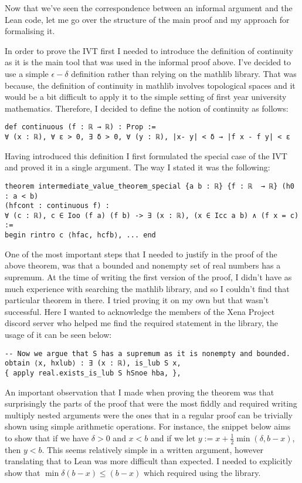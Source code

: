 \documentclass[11pt]{article}
\begin{document}
Now that we've seen the correspondence between an informal argument and the
Lean code, let me go over the structure of the main proof and my approach for
formalising it.

In order to prove the IVT first I needed to introduce the definition of
continuity as it is the main tool that was used in the informal proof above.
I've decided to use a simple $\epsilon-\delta$ definition rather than relying
on the mathlib library. That was because, the definition of continuity in
mathlib involves topological spaces and it would be a bit difficult to apply
it to the simple setting of first year university mathematics. Therefore, I
decided to define the notion of continuity as follows:


\begin{verbatim}
def continuous (f : ℝ → ℝ) : Prop :=
∀ (x : ℝ), ∀ ε > 0, ∃ δ > 0, ∀ (y : ℝ), |x- y| < δ → |f x - f y| < ε
\end{verbatim}
Having introduced this definition I first formulated the special case of the
IVT and proved it in a single argument. The way I stated it was the following:

\begin{verbatim}
theorem intermediate_value_theorem_special {a b : ℝ} {f : ℝ  → ℝ} (h0 : a < b)
(hfcont : continuous f) :
∀ (c : ℝ), c ∈ Ioo (f a) (f b) -> ∃ (x : ℝ), (x ∈ Icc a b) ∧ (f x = c) :=
begin rintro c ⟨hfac, hcfb⟩, ... end
\end{verbatim}
One of the most important steps that I needed to justify in the proof of the
above theorem, was that a bounded and nonempty set of real numbers has a
supremum. At the time of writing the first version of the proof, I didn't have
as much experience with searching the mathlib library, and so I couldn't find
that particular theorem in there. I tried proving it on my own but that wasn't
successful. Here I wanted to acknowledge the members of the Xena Project
discord server who helped me find the required statement in the library, the
usage of it can be seen below:

\begin{verbatim}
-- Now we argue that S has a supremum as it is nonempty and bounded.
obtain ⟨x, hxlub⟩ : ∃ (x : ℝ), is_lub S x,
{ apply real.exists_is_lub S hSnoe hba, },
\end{verbatim}
An important observation that I made when proving the theorem was that
surprisingly the parts of the proof that were the most fiddly and required
writing multiply nested arguments were the ones that in a regular proof
can be trivially shown using simple arithmetic operations. For instance, the
snippet below aims to show that if we have $\delta > 0$ and $x < b$ and if we
let $y := x + \frac{1}{2}\min(\delta, b - x)$, then $y < b$. This seems
relatively simple in a written argument, however translating that to Lean was
more difficult than expected. I needed to explicitly show that $\min \delta (b - x) \le (b - x)$
which required using the library.
\end{document}
